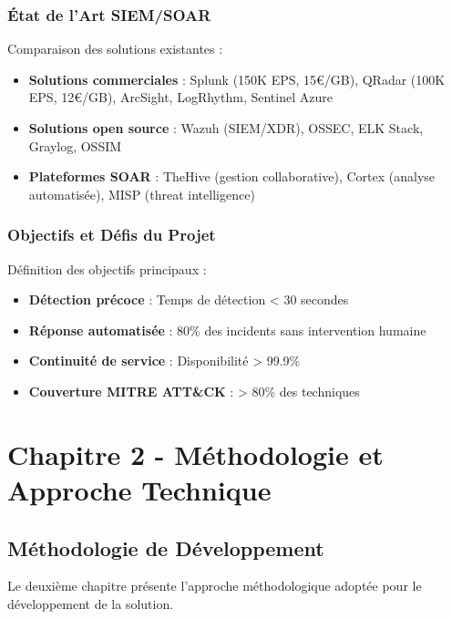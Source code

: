 \subsubsection{État de l'Art SIEM/SOAR}
Comparaison des solutions existantes :
\begin{itemize}
    \item \textbf{Solutions commerciales} : Splunk (150K EPS, 15€/GB), QRadar (100K EPS, 12€/GB), ArcSight, LogRhythm, Sentinel Azure
    \item \textbf{Solutions open source} : Wazuh (SIEM/XDR), OSSEC, ELK Stack, Graylog, OSSIM
    \item \textbf{Plateformes SOAR} : TheHive (gestion collaborative), Cortex (analyse automatisée), MISP (threat intelligence)
\end{itemize}

\subsubsection{Objectifs et Défis du Projet}
Définition des objectifs principaux :
\begin{itemize}
    \item \textbf{Détection précoce} : Temps de détection < 30 secondes
    \item \textbf{Réponse automatisée} : 80\% des incidents sans intervention humaine
    \item \textbf{Continuité de service} : Disponibilité > 99.9\%
    \item \textbf{Couverture MITRE ATT\&CK} : > 80\% des techniques
\end{itemize}

\section{Chapitre 2 - Méthodologie et Approche Technique}

\subsection{Méthodologie de Développement}

Le deuxième chapitre présente l'approche méthodologique adoptée pour le développement de la solution.

